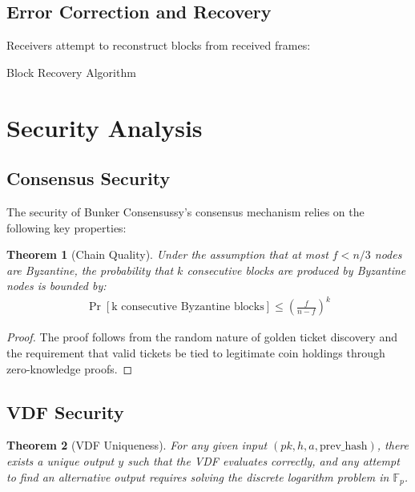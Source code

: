 \documentclass[11pt,a4paper]{article}
\newtheorem{theorem}{Theorem}[section]
\begin{document}
\subsection{Error Correction and Recovery}

Receivers attempt to reconstruct blocks from received frames:

\begin{algorithm}[H]
\SetAlgoLined
{}
\caption{Block Recovery Algorithm}

\Return{$\perp$}\;
\end{algorithm}

\section{Security Analysis}

\subsection{Consensus Security}

The security of Bunker Consensussy's consensus mechanism relies on the following key properties:

\begin{theorem}[Chain Quality]
Under the assumption that at most $f < n/3$ nodes are Byzantine, the probability that $k$ consecutive blocks are produced by Byzantine nodes is bounded by:
\begin{align}
\Pr[\text{k consecutive Byzantine blocks}] \leq \left(\frac{f}{n-f}\right)^k
\end{align}
\end{theorem}

\begin{proof}
The proof follows from the random nature of golden ticket discovery and the requirement that valid tickets be tied to legitimate coin holdings through zero-knowledge proofs.
\end{proof}

\subsection{VDF Security}

\begin{theorem}[VDF Uniqueness]
For any given input $(pk, h, a, \text{prev\_hash})$, there exists a unique output $y$ such that the VDF evaluates correctly, and any attempt to find an alternative output requires solving the discrete logarithm problem in $\mathbb{F}_p$.
\end{theorem}
\end{document}
